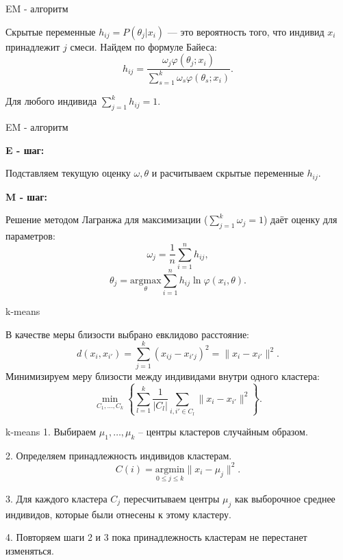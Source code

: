 \documentclass{beamer}
\begin{document}


\begin{frame}{EM - алгоритм}

Скрытые переменные $h_{ij} = P(\theta_{j}|x_{i})$ --- это вероятность того, что индивид $x_{i}$ принадлежит $j$ смеси. Найдем по формуле Байеса:
$$
h_{ij} = \frac{ \omega_{j} \varphi(\theta_{j}; x_{i})}{\sum\limits_{s=1}^k \omega_{s} \varphi(\theta_{s}; x_{i})}.
$$

Для любого индивида $\sum\limits_{j=1}^k h_{ij} = 1.$

\end{frame}



\begin{frame}{EM - алгоритм}

\textbf{E - шаг:}

Подставляем текущую оценку $\omega, \theta$ и расчитываем скрытые переменные  $h_{ij}$.

\textbf{M - шаг:}

Решение методом Лагранжа для максимизации ($\sum\limits_{j=1}^k\omega_{j} = 1$) даёт оценку для параметров:
$$
\omega_{j} = \frac{1}{n} \sum\limits_{i=1}^n h_{ij},
$$
$$
\theta_{j} = \underset{\theta}{\text{argmax}} \sum\limits_{i=1}^n h_{ij} \ln{\varphi(x_{i}, \theta)}.
$$

\end{frame}


\begin{frame}{k-means}

В качестве меры близости выбрано евклидово расстояние: 
$$
d(x_{i}, x_{i'}) = \sum\limits_{j=1}^k (x_{ij} - x_{i'j})^{2} = \| x_{i} - x_{i'} \|^{2}.
$$
Минимизируем меру близости между индивидами внутри одного кластера:
$$
\underset{C_{1},\ldots, C_{k}}\min \left\{ \sum\limits_{l=1}^k \frac{1}{|C_{l}|} \sum\limits_{i,i' \in C_{l}}   \| x_{i} - x_{i'} \|^{2} \right\}.
$$

\end{frame}


\begin{frame}{k-means}
1. Выбираем $\mu_{1},\ldots, \mu_{k}$ -- центры кластеров случайным образом.

2. Определяем принадлежность индивидов кластерам. $$C(i) = \underset{0 \leq j \leq  k}{\text{argmin}} \|x_{i} - \mu_{j} \|^{2}.$$

3. Для каждого кластера $C_{j}$ пересчитываем центры $\mu_{j}$ как выборочное среднее индивидов, которые были отнесены к этому кластеру.

4. Повторяем шаги 2 и 3 пока принадлежность кластерам не перестанет изменяться.
\end{frame}
\end{document}
